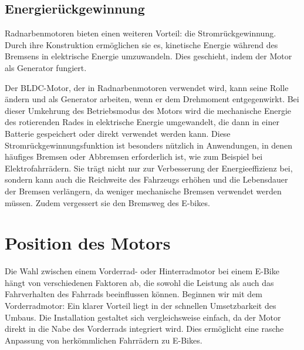 





\subsection{Energierückgewinnung}

Radnarbenmotoren bieten einen weiteren Vorteil: die Stromrückgewinnung. Durch ihre Konstruktion ermöglichen sie es, kinetische Energie während des Bremsens in elektrische Energie umzuwandeln. Dies geschieht, indem der Motor als Generator fungiert.

Der BLDC-Motor, der in Radnarbenmotoren verwendet wird, kann seine Rolle ändern und als Generator arbeiten, wenn er dem Drehmoment entgegenwirkt. Bei dieser Umkehrung des Betriebsmodus des Motors wird die mechanische Energie des rotierenden Rades in elektrische Energie umgewandelt, die dann in einer Batterie gespeichert oder direkt verwendet werden kann. Diese Stromrückgewinnungsfunktion ist besonders nützlich in Anwendungen, in denen häufiges Bremsen oder Abbremsen erforderlich ist, wie zum Beispiel bei Elektrofahrrädern. Sie trägt nicht nur zur Verbesserung der Energieeffizienz bei, sondern kann auch die Reichweite des Fahrzeugs erhöhen und die Lebensdauer der Bremsen verlängern, da weniger mechanische Bremsen verwendet werden müssen. Zudem vergessert sie den Bremsweg des E-bikes.




\section{Position des Motors}
Die Wahl zwischen einem Vorderrad- oder Hinterradmotor bei einem E-Bike hängt von verschiedenen Faktoren ab, die sowohl die Leistung als auch das Fahrverhalten des Fahrrads beeinflussen können. Beginnen wir mit dem Vorderradmotor: Ein klarer Vorteil liegt in der schnellen Umsetzbarkeit des Umbaus. Die Installation gestaltet sich vergleichsweise einfach, da der Motor direkt in die Nabe des Vorderrads integriert wird. Dies ermöglicht eine rasche Anpassung von herkömmlichen Fahrrädern zu E-Bikes.

